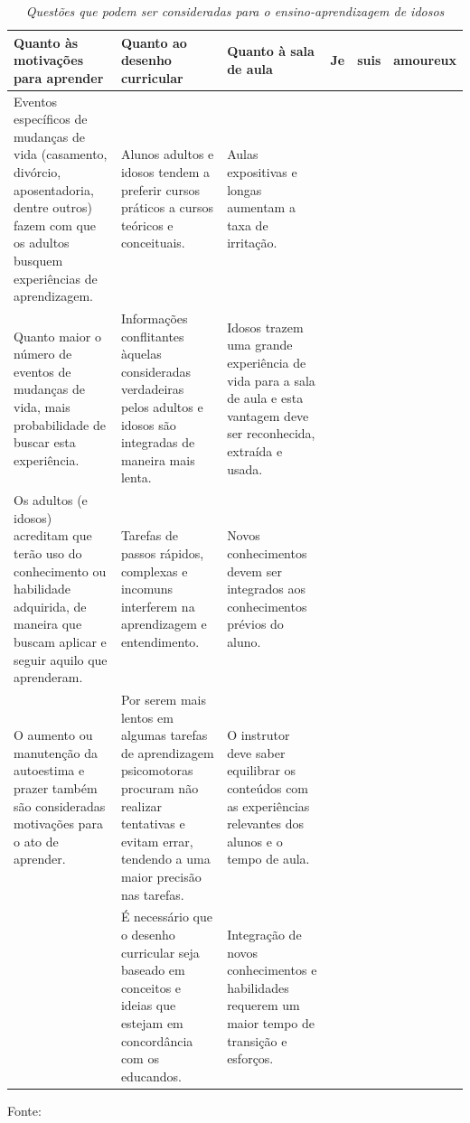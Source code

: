 \begin{table}[!ht]
\centering
\caption{\textit{Questões que podem ser consideradas para o ensino-aprendizagem de idosos}}
\centering
\footnotesize
\begin{tabular}{p{2cm} p{2cm} p{6cm} p{2.5cm} p{2.5cm}}
\toprule
\textbf{Quanto às
motivações para aprender} & \textbf{Quanto ao
desenho curricular} & \textbf{Quanto à
sala de aula}        
&
Je 
&
suis
&
amoureux
\\ \midrule

Eventos específicos de mudanças de
vida (casamento, divórcio, aposentadoria, dentre outros) fazem com que
os adultos busquem experiências de
aprendizagem.
& 
Alunos adultos e idosos tendem a
preferir cursos práticos a cursos teóricos e conceituais.
&
Aulas expositivas e longas aumentam a taxa de irritação.
\\ \midrule

Quanto maior o número de eventos
de mudanças de vida, mais probabilidade de buscar esta experiência.
& 
Informações conflitantes àquelas
consideradas verdadeiras pelos adultos e idosos são integradas de maneira mais lenta.
&
Idosos trazem uma grande experiência de vida para a sala de aula e
esta vantagem deve ser reconhecida,
extraída e usada.
\\ \midrule

Os adultos (e idosos) acreditam que
terão uso do conhecimento ou habilidade adquirida, de maneira que
buscam aplicar e seguir aquilo que
aprenderam.
& 
Tarefas de passos rápidos, complexas e incomuns interferem na aprendizagem e entendimento.
&
Novos conhecimentos devem ser integrados aos conhecimentos prévios
do aluno.
\\ \midrule

O aumento ou manutenção da autoestima e prazer também são consideradas motivações para o ato de
aprender.
& 
Por serem mais lentos em algumas
tarefas de aprendizagem psicomotoras procuram não realizar tentativas e evitam errar, tendendo a uma
maior precisão nas tarefas.
&
O instrutor deve saber equilibrar os
conteúdos com as experiências relevantes dos alunos e o tempo de aula.
\\ \midrule
& 
É necessário que o desenho curricular seja baseado em conceitos e
ideias que estejam em concordância
com os educandos.
&
Integração de novos conhecimentos
e habilidades requerem um maior
tempo de transição e esforços.
\\ \midrule
\end{tabular}
\label{tab:questoesAprIdosos}

Fonte: \cite{Oliveira2019_quali}
\end{table}

